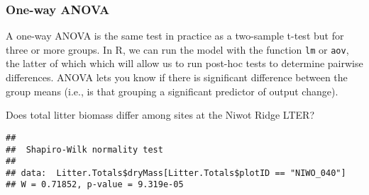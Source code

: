 \documentclass[
]{article}
\newenvironment{Shaded}{\begin{snugshade}}{\end{snugshade}}
\newcommand{\CommentTok}[1]{\textcolor[rgb]{0.56,0.35,0.01}{\textit{#1}}}
\newcommand{\DataTypeTok}[1]{\textcolor[rgb]{0.13,0.29,0.53}{#1}}
\newcommand{\KeywordTok}[1]{\textcolor[rgb]{0.13,0.29,0.53}{\textbf{#1}}}
\newcommand{\NormalTok}[1]{#1}
\newcommand{\OperatorTok}[1]{\textcolor[rgb]{0.81,0.36,0.00}{\textbf{#1}}}
\newcommand{\StringTok}[1]{\textcolor[rgb]{0.31,0.60,0.02}{#1}}
\begin{document}
\hypertarget{one-way-anova}{%
\subsubsection{One-way ANOVA}\label{one-way-anova}}

A one-way ANOVA is the same test in practice as a two-sample t-test but
for three or more groups. In R, we can run the model with the function
\texttt{lm} or \texttt{aov}, the latter of which which will allow us to
run post-hoc tests to determine pairwise differences. ANOVA lets you
know if there is significant difference between the group means (i.e.,
is that grouping a significant predictor of output change).

Does total litter biomass differ among sites at the Niwot Ridge LTER?

\begin{Shaded}
\end{Shaded}

\begin{verbatim}
## 
##  Shapiro-Wilk normality test
## 
## data:  Litter.Totals$dryMass[Litter.Totals$plotID == "NIWO_040"]
## W = 0.71852, p-value = 9.319e-05
\end{verbatim}

\begin{Shaded}
\end{Shaded}
\end{document}
